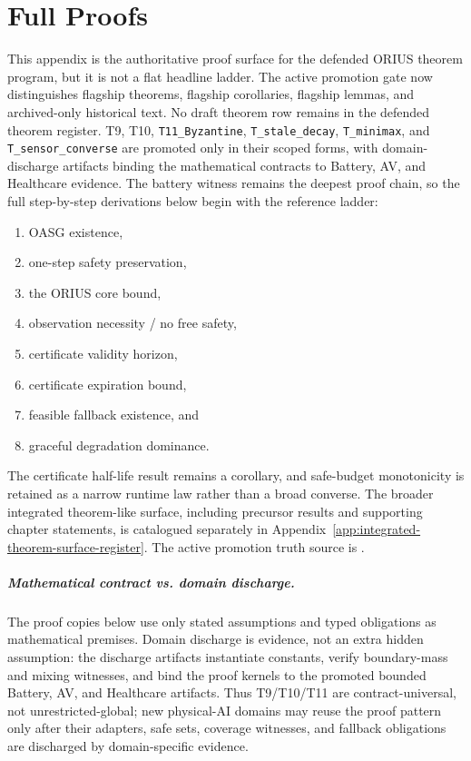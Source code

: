 \chapter{Full Proofs}
\label{app:proofs}

This appendix is the authoritative proof surface for the defended ORIUS
theorem program, but it is not a flat headline ladder.  The active promotion
gate now distinguishes flagship theorems, flagship corollaries, flagship
lemmas, and archived-only historical text.  No draft theorem row remains in the
defended theorem register.  T9, T10, \texttt{T11\_Byzantine},
\texttt{T\_stale\_decay}, \texttt{T\_minimax}, and
\texttt{T\_sensor\_converse} are promoted only in their scoped forms, with
domain-discharge artifacts binding the mathematical contracts to Battery, AV,
and Healthcare evidence.  The battery witness remains the deepest proof chain,
so the full step-by-step derivations
below begin with the reference ladder:
\begin{enumerate}
  \item OASG existence,
  \item one-step safety preservation,
  \item the ORIUS core bound,
  \item observation necessity / no free safety,
  \item certificate validity horizon,
  \item certificate expiration bound,
  \item feasible fallback existence, and
  \item graceful degradation dominance.
\end{enumerate}
The certificate half-life result remains a corollary, and safe-budget
monotonicity is retained as a narrow runtime law rather than a broad converse.
The broader integrated theorem-like surface, including precursor results and
supporting chapter statements, is catalogued separately in
Appendix~\ref{app:integrated-theorem-surface-register}.  The active promotion
truth source is .

\paragraph{Mathematical contract vs. domain discharge.}
The proof copies below use only stated assumptions and typed obligations as
mathematical premises.  Domain discharge is evidence, not an extra hidden assumption: the discharge artifacts instantiate constants, verify
boundary-mass and mixing witnesses, and bind the proof kernels to the promoted
bounded Battery, AV, and Healthcare artifacts.  Thus T9/T10/T11 are
contract-universal, not unrestricted-global; new physical-AI domains may reuse
the proof pattern only after their adapters, safe sets, coverage witnesses, and
fallback obligations are discharged by domain-specific evidence.

